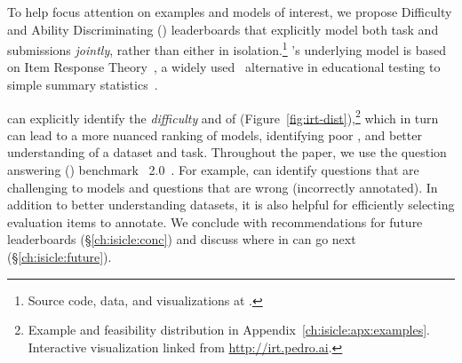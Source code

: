 To help focus attention on examples and models of interest, we propose Difficulty and Ability Discriminating (\name{}) leaderboards that explicitly model both task and submissions \emph{jointly}, rather than either in isolation.\footnote{Source code, data, and visualizations at \projecturl{}.}
%
\name{}'s underlying model is based on Item Response
Theory~\citep[, reviewed in \S\ref{ch:isicle:lead}]{lord1968test,baker2001irt}, a widely used~\citep{van2016assess} alternative in educational testing to
simple
summary statistics~\citep{edgeworth1888exams}.

\name{} can explicitly identify the \emph{difficulty} and \emph{\discability{}} of \itms{} (Figure~\ref{fig:irt-dist}),\footnote{
  Example and feasibility distribution in Appendix~\ref{ch:isicle:apx:examples}.
  Interactive visualization linked from \href{https://irt.pedro.ai}{http://irt.pedro.ai}.
} which in turn can lead to a more nuanced ranking of models, identifying poor \itms{}, and better understanding of a dataset and task.
%
Throughout the paper, we use the question answering (\qa{}) benchmark \squad{}~2.0~\citep{rajpurkar2018know}.
%
For example, \name{} can identify questions that are challenging to models and questions that are wrong (incorrectly annotated).
%
In addition to better understanding datasets, it is also helpful for
efficiently selecting evaluation items to annotate.
We conclude with recommendations for future leaderboards (\S\ref{ch:isicle:conc}) and discuss where \irt{} in \nlp{} can go next (\S\ref{ch:isicle:future}).
